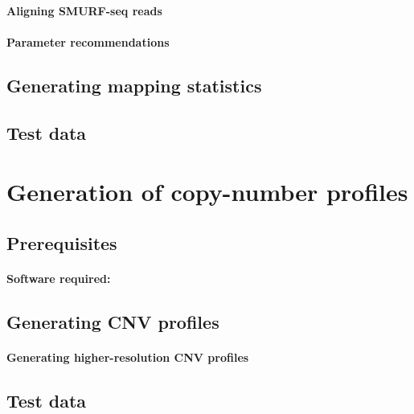 \documentclass[11pt]{article}
\begin{document}
\paragraph{Aligning SMURF-seq reads}

\paragraph{Parameter recommendations}


\subsection{Generating mapping statistics}

\subsection{Test data}


\section{Generation of copy-number profiles}
\label{cnv}

\subsection{Prerequisites}
\paragraph{Software required:}

\subsection{Generating CNV profiles}

\paragraph{Generating higher-resolution CNV profiles}

\subsection{Test data}
\end{document}
